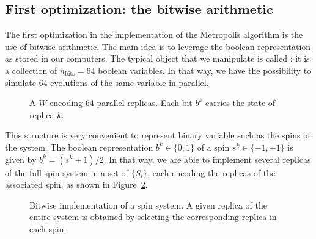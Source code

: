 \subsection{First optimization: the bitwise arithmetic}
The first optimization in the implementation of the Metropolis algorithm is the use of bitwise arithmetic. The main idea is to leverage the boolean representation as stored in our computers. The typical object that we manipulate is called \Bits: it is a collection of $n_\text{bits}=64$ boolean variables. In that way, we have the possibility to simulate $64$ evolutions of the same variable in parallel.
\nolinenumbers
\begin{figure}[ht]
\centering
{}
\caption{A \Bits $W$ encoding 64 parallel replicas. Each bit $b^k$ carries the state of replica $k$.}
\label{fig:Bits}
\end{figure}
\linenumbers
This structure is very convenient to represent binary variable such as the spins of the system. The boolean representation $b^k \in \{0,1\}$ of a spin $s^k \in \{-1,+1\}$ is given by $b^k = (s^k+1)/2$. In that way, we are able to implement several replicas of the full spin system in a set of \Bits $\{S_i\}$, each encoding the replicas of the associated spin, as shown in Figure~\ref{fig:spins_Bits}.
\nolinenumbers
\begin{figure}[t]
\centering
\def\svgwidth{0.7\linewidth}

\caption{Bitwise implementation of a spin system. A given replica of the entire system is obtained by selecting the corresponding replica in each spin.}
\label{fig:spins_Bits}
\end{figure}
